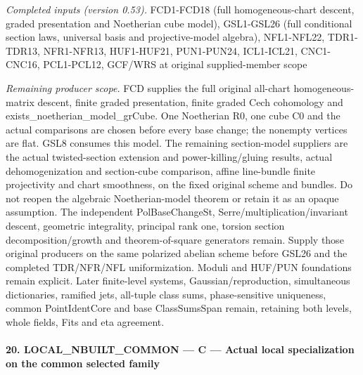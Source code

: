 \documentclass[11pt,a4paper]{article}
\numberwithin{equation}{section}
\theoremstyle{remark}\newtheorem{remark}[theorem]{Remark}
\begin{document}
\emph{Completed inputs (version 0.53).} FCD1-FCD18 (full homogeneous-chart descent, graded presentation and Noetherian cube model), GSL1-GSL26 (full conditional section laws, universal basis and projective-model algebra), NFL1-NFL22, TDR1-TDR13, NFR1-NFR13, HUF1-HUF21, PUN1-PUN24, ICL1-ICL21, CNC1-CNC16, PCL1-PCL12, GCF/WRS at original supplied-member scope

\emph{Remaining producer scope.} FCD supplies the full original all-chart homogeneous-matrix descent, finite graded presentation, finite graded Cech cohomology and exists\_\allowbreak noetherian\_\allowbreak model\_\allowbreak grCube. One Noetherian R0, one cube C0 and the actual comparisons are chosen before every base change; the nonempty vertices are flat. GSL8 consumes this model. The remaining section-model suppliers are the actual twisted-section extension and power-killing/gluing results, actual dehomogenization and section-cube comparison, affine line-bundle finite projectivity and chart smoothness, on the fixed original scheme and bundles. Do not reopen the algebraic Noetherian-model theorem or retain it as an opaque assumption. The independent PolBaseChangeSt, Serre/multiplication/invariant descent, geometric integrality, principal rank one, torsion section decomposition/growth and theorem-of-square generators remain. Supply those original producers on the same polarized abelian scheme before GSL26 and the completed TDR/NFR/NFL uniformization. Moduli and HUF/PUN foundations remain explicit. Later finite-level systems, Gaussian/reproduction, simultaneous dictionaries, ramified jets, all-tuple class sums, phase-sensitive uniqueness, common PointIdentCore and base ClassSumsSpan remain, retaining both levels, whole fields, Fits and eta agreement.



\paragraph{20. LOCAL\_\allowbreak NBUILT\_\allowbreak COMMON — C — Actual local specialization on the common selected family}
\end{document}

